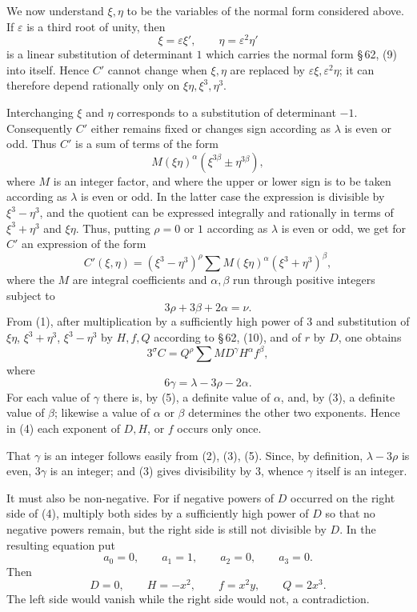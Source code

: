 \documentclass[11pt]{article}
\providecommand{\eps}{\varepsilon}
\begin{document}
We now understand $\xi,\eta$ to be the variables of the normal form considered above. If $\eps$ is a third root of unity, then
\[
 \xi=\eps\xi',
 \qquad
 \eta=\eps^2\eta'
\]
is a linear substitution of determinant $1$ which carries the normal form \S\,62, (9) into itself. Hence $C'$ cannot change when $\xi,\eta$ are replaced by $\eps\xi,\eps^2\eta$; it can therefore depend rationally only on $\xi\eta,\xi^3,\eta^3$.

Interchanging $\xi$ and $\eta$ corresponds to a substitution of determinant $-1$. Consequently $C'$ either remains fixed or changes sign according as $\lambda$ is even or odd. Thus $C'$ is a sum of terms of the form
\[
 M(\xi\eta)^\alpha(\xi^{3\beta}\pm\eta^{3\beta}),
\]
where $M$ is an integer factor, and where the upper or lower sign is to be taken according as $\lambda$ is even or odd. In the latter case the expression is divisible by $\xi^3-\eta^3$, and the quotient can be expressed integrally and rationally in terms of $\xi^3+\eta^3$ and $\xi\eta$. Thus, putting $\rho=0$ or $1$ according as $\lambda$ is even or odd, we get for $C'$ an expression of the form
\[
 C'(\xi,\eta)=(\xi^3-\eta^3)^\rho\sum M(\xi\eta)^\alpha(\xi^3+\eta^3)^\beta,
\]
where the $M$ are integral coefficients and $\alpha,\beta$ run through positive integers subject to
\begin{equation}
 3\rho+3\beta+2\alpha=\nu.
\tag{3}
\end{equation}
From (1), after multiplication by a sufficiently high power of $3$ and substitution of $\xi\eta$, $\xi^3+\eta^3$, $\xi^3-\eta^3$ by $H,f,Q$ according to \S\,62, (10), and of $r$ by $D$, one obtains
\begin{equation}
 3^\sigma C=Q^\rho\sum M D^\gamma H^\alpha f^\beta,
\tag{4}
\end{equation}
where
\begin{equation}
 6\gamma=\lambda-3\rho-2\alpha.
\tag{5}
\end{equation}
For each value of $\gamma$ there is, by (5), a definite value of $\alpha$, and, by (3), a definite value of $\beta$; likewise a value of $\alpha$ or $\beta$ determines the other two exponents. Hence in (4) each exponent of $D,H$, or $f$ occurs only once.

That $\gamma$ is an integer follows easily from (2), (3), (5). Since, by definition, $\lambda-3\rho$ is even, $3\gamma$ is an integer; and (3) gives divisibility by $3$, whence $\gamma$ itself is an integer.

It must also be non-negative. For if negative powers of $D$ occurred on the right side of (4), multiply both sides by a sufficiently high power of $D$ so that no negative powers remain, but the right side is still not divisible by $D$. In the resulting equation put
\begin{equation}
 a_0=0,
 \qquad a_1=1,
 \qquad a_2=0,
 \qquad a_3=0.
\tag{6}
\end{equation}
Then
\begin{equation}
 D=0,
 \qquad H=-x^2,
 \qquad f=x^2y,
 \qquad Q=2x^3.
\tag{7}
\end{equation}
The left side would vanish while the right side would not, a contradiction.
\end{document}
